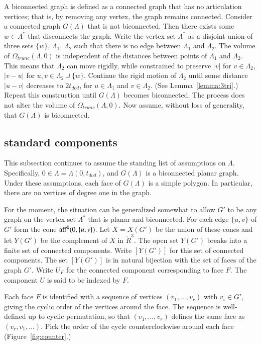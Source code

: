 A biconnected graph is defined as a connected graph that has no
articulation vertices; that is, by removing any vertex, the
graph remains connected.
Consider a connected graph $G(\Lambda)$ that is not biconnected.
Then there exists some $w\in \Lambda^*$ that disconnects
the graph.  Write the vertex set $\Lambda^*$
as a disjoint union of three sets
$\{w\}$, $\Lambda_1$, $\Lambda_2$ such that there is no edge between
$\Lambda_1$ and $\Lambda_2$.  The volume of $\Omega_{trunc}(\Lambda,0)$
is independent of the distances between points of $\Lambda_1$ and
$\Lambda_2$.  This means that  $\Lambda_2$ can move rigidly,
while constrained to preserve $|v|$ for $v\in\Lambda_2$, $|v-u|$
for $u,v\in \Lambda_2\cup\{w\}$. 
Continue the rigid motion of $\Lambda_2$ until some distance
$|u-v|$ decreases to $2t_{dod}$, for
$u\in\Lambda_1$ and $v\in\Lambda_2$. (See Lemma~\ref{lemma:3tri}.) 
Repeat this construction until $G(\Lambda)$ becomes biconnected.  The process does not alter the volume of $\Omega_{trunc}(\Lambda,0)$.
Now assume, without loss of generality, that $G(\Lambda)$ is
biconnected.



\subsection{standard components}

This subsection continues to assume 
the standing list of assumptions on $\Lambda$.  Specifically,
$0\in\Lambda = \Lambda(0,t_{dod})$, and $G(\Lambda)$ is a 
biconnected planar graph.
Under these assumptions, each face of $G(\Lambda)$ is a simple
polygon.  In particular, there are no vertices of degree one 
in the graph.

For the moment, the situation can be generalized somewhat to
allow $G'$ to be any graph on the vertex set $\Lambda^*$ that
is planar and biconnected.
For each edge $\{u,v\}$ of $G'$ form the cone
${\operatorname{aff}}^0(0,\{u,v\})$.  Let $X=X(G')$ be the union of these
cones and let $Y(G')$ be the complement of $X$ in $\ring{R}^3$.
The open set $Y(G')$ breaks into a finite set of connected
components. 
Write $[Y(G')]$ for this set of connected
components.  The set $[Y(G')]$ is in natural bijection with
the set of faces of the graph $G'$.  Write $U_F$ for the 
connected component corresponding to face $F$.  The component
 $U$ is said to be indexed by $F$.

Each face $F$ is identified with a sequence of vertices
$(v_1,\ldots,v_r)$ with $v_i\in G'$, giving the cyclic
order of the vertices around the face.  The sequence is well-defined up to cyclic permutation, so that $(v_1,\ldots,v_r)$
defines the same face as $(v_r,v_1,\ldots)$.  Pick the
order of the cycle counterclockwise around each face
 (Figure~\ref{fig:counter}.)

